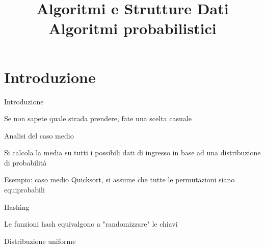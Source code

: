 
\title[ASD - Algoritmi probabilistici]{\textbf{Algoritmi e Strutture Dati}\\[24pt]Algoritmi probabilistici}

\usepackage[mode=buildnew]{standalone}
\usepackage{xcolor}
\usepackage{colortbl}
\usepackage{epigraph}
\usepackage{tikz}
\usepackage{xmpmulti}
\usepackage{listings}


\newcommand{\R}[1]{\textcolor{red}{#1}}
\newcommand{\B}[1]{\textcolor{blue}{#1}}

\renewcommand{\Primo}{\mathit{start}\xspace}
\renewcommand{\Ultimo}{\mathit{end}\xspace}

\renewcommand{\arraystretch}{1.4}
\graphicspath{{figs/17/}}





\FrameTitle{}

\FrameContent



\section{Introduzione}

\begin{frame}{Introduzione}

\vspace{-9pt}
\BIL
\item Se non sapete quale strada prendere, fate una scelta casuale
\EIL

\BIL
\item Analisi del caso medio
  \BI
  \item Si calcola la media su tutti i possibili dati di ingresso
  in base ad una distribuzione di probabilità
  \item Esempio: caso medio Quicksort, si assume che tutte 
  le permutazioni siano equiprobabili
  \EI
\item Hashing
  \BI 
  \item Le funzioni hash equivalgono a "randomizzare" le chiavi
  \item Distribuzione uniforme
  \EI
\EIL

\end{frame}

